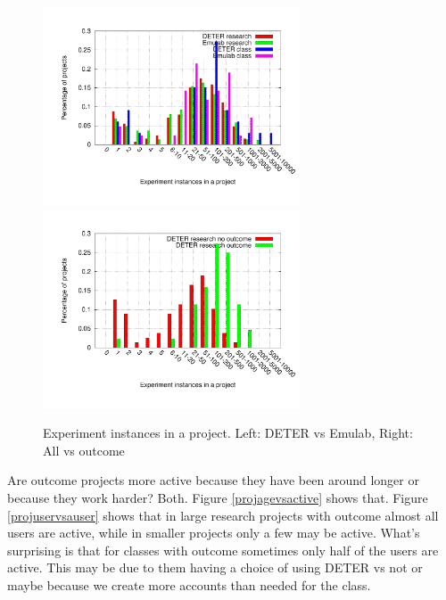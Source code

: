 \documentclass[10pt, twocolumn]{article} %
\begin{document}
\begin{figure}[htbp] \begin{center} \includegraphics[width=3in,
type=pdf,ext=.pdf,read=.pdf]{figs/proj.swaps.gnu}
\includegraphics[width=3in,
type=pdf,ext=.pdf,read=.pdf]{figs/proj.swaps.cmp.gnu}
\caption{Experiment instances in a project. Left: DETER vs Emulab,
Right: All vs outcome} \label{projswaps} \end{center} \end{figure}

Are outcome projects more active because they have been around longer or
because they work harder? Both. Figure \ref{projagevsactive} shows that.
Figure \ref{projuservsauser} shows that in large research projects with
outcome almost all users are active, while in smaller projects only a
few may be active. What's surprising is that for classes with outcome
sometimes only half of the users are active. This may be due to them
having a choice of using DETER vs not or maybe because we create more
accounts than needed for the class.
\end{document}
